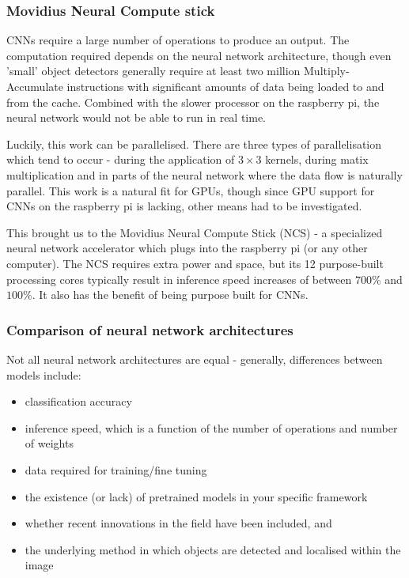 \subsubsection{Movidius Neural Compute stick}
CNNs require a large number of operations to produce an output. The computation required depends on the neural network architecture, though even 'small' object detectors generally require at least two million Multiply-Accumulate instructions with significant amounts of data being loaded to and from the cache. Combined with the slower processor on the raspberry pi, the neural network would not be able to run in real time.


Luckily, this work can be parallelised. There are three types of parallelisation which tend to occur - during the application of $3 \times 3$ kernels, during matix multiplication and in parts of the neural network where the data flow is naturally parallel. This work is a natural fit for GPUs, though since GPU support for CNNs on the raspberry pi is lacking, other means had to be investigated.


This brought us to the Movidius Neural Compute Stick (NCS) - a specialized neural network accelerator which plugs into the raspberry pi (or any other computer). The NCS requires extra power and space, but its 12 purpose-built processing cores typically result in inference speed increases of between $700\%$ and $100\%$. It also has the benefit of being purpose built for CNNs.


\subsubsection{Comparison of neural network architectures}
Not all neural network architectures are equal - generally, differences between models include:

\begin{itemize}
	\item classification accuracy
	\item inference speed, which is a function of the number of operations and number of weights
	\item data required for training/fine tuning
	\item the existence (or lack) of pretrained models in your specific framework
	\item whether recent innovations in the field have been included, and
	\item the underlying method in which objects are detected and localised within the image
\end{itemize}

